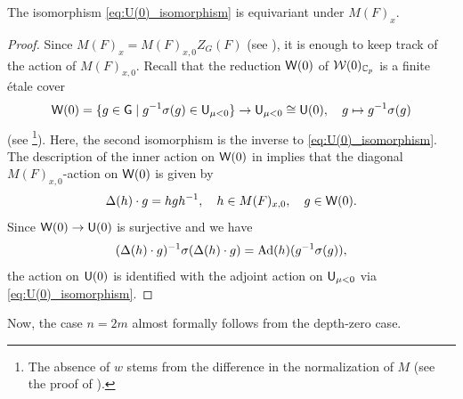 \documentclass[12pt,reqno]{amsart}
\begin{document}
\begin{lem} \label{lem:equivariance_M_x_depth_zero}
    The isomorphism \eqref{eq:U(0)_isomorphism} is equivariant under $M(F)_x$.  
\end{lem}
\begin{proof}
    Since $M(F)_x = M(F)_{x, 0} Z_G(F)$ (see ), it is enough to keep track of the action of $M(F)_{x, 0}$. Recall that the reduction ${\mathsf{W}}(0)$ of ${\mathcal{W}}(0)_{\mathbb{C}_p}$ is a finite \'{e}tale cover 
    \[
        {\mathsf{W}}(0) = \{ g \in {\mathsf{G}} \mid g^{-1} \sigma(g) \in {\mathsf{U}}_{\mu < 0} \} \to {\mathsf{U}}_{\mu < 0} \cong {\mathsf{U}}(0) ,\quad g \mapsto g^{-1} \sigma(g)
    \]
    (see \cite[Proposition 3.10]{Tak25z}\footnote{The absence of $w$ stems from the difference in the normalization of $M$ (see the proof of ).}). Here, the second isomorphism is the inverse to \eqref{eq:U(0)_isomorphism}. The description of the inner action on ${\mathsf{W}}(0)$ in \cite[Proposition 5.7]{Tak25z} implies that the diagonal $M(F)_{x, 0}$-action on ${\mathsf{W}}(0)$ is given by 
    \[
        \Delta(h) \cdot g = hgh^{-1} ,\quad h \in M(F)_{x, 0},\quad g \in {\mathsf{W}}(0). 
    \]
    Since ${\mathsf{W}}(0) \to {\mathsf{U}}(0)$ is surjective and we have
    \[
        (\Delta(h) \cdot g)^{-1} \sigma(\Delta(h) \cdot g) = {\operatorname{Ad}}(h)(g^{-1} \sigma(g)), 
    \]
    the action on ${\mathsf{U}}(0)$ is identified with the adjoint action on ${\mathsf{U}}_{\mu < 0}$ via \eqref{eq:U(0)_isomorphism}.
\end{proof}

Now, the case $n = 2m$ almost formally follows from the depth-zero case. 
\end{document}
